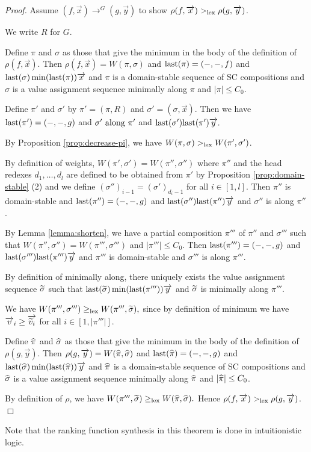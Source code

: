 {\em Proof.}
Assume $(f,\Vec x) \to^G (g,\Vec y)$ to show
$\rho(f,\Vec x) >_\Lex \rho(g,\Vec y)$.

We write $R$ for $G$.

Define $\pi$ and $\sigma$ as those that give the minimum
in the body of the definition of $\rho(f,\Vec x)$.
Then
$
\rho(f,\Vec x)=W(\pi,\sigma)
$
and
$
\Last(\pi) = (-,-,f)
$
and
$
\Last(\sigma) \min(\Last(\pi)) \Vec x
$
and
$\pi$ is a domain-stable sequence of SC compositions and
$\sigma$ is a value assignment sequence minimally along $\pi$ and
$|\pi| \le C_0$.

Define $\pi'$ and $\sigma'$ by
$
\pi'=(\pi,R)
$
and
$
\sigma'=(\sigma,\Vec x).
$
Then we have
$
\Last(\pi') = (-,-,g)
$
and
$
\sigma' \hbox{\ along\ } \pi'
$
and
$\Last(\sigma') \Last(\pi') \Vec y.$

By Proposition \ref{prop:decrease-pi},
we have
$W(\pi,\sigma) >_\Lex W(\pi',\sigma')$.

By definition of weights,
$
W(\pi',\sigma')=W(\pi'',\sigma'')
$
where $\pi''$ and the head redexes $d_1,\ldots,d_l$ are 
defined to be obtained from $\pi'$ by
Proposition \ref{prop:domain-stable} (2) and
we define $(\sigma'')_{i-1} = (\sigma')_{d_i-1}$ for all $i \in [1,l]$.
Then
$\pi''$ is domain-stable
and $\Last(\pi'')=(-,-,g)$
and $\Last(\sigma'') \Last(\pi'') \Vec y$
and $\sigma''$ is along $\pi''$.

By Lemma \ref{lemma:shorten},
we have a partial composition $\pi'''$ of $\pi''$ and $\sigma'''$
such that
$
W(\pi'',\sigma'')=W(\pi''',\sigma''')
$
and $|\pi'''| \le C_0$.
Then $\Last(\pi''')=(-,-,g)$
and $\Last(\sigma''') \Last(\pi''') \Vec y$
and $\pi'''$ is domain-stable
and $\sigma'''$ is along $\pi'''$.

By definition of minimally along,
there uniquely exists the value assignment sequence $\Tilde\sigma$ such that
$\Last(\Tilde\sigma) \min(\Last(\pi''')) \Vec y$
and $\Tilde\sigma$ is minimally along $\pi'''$.

We have
$
W(\pi''',\sigma''')\ge_\Lex W(\pi''',\Tilde\sigma),
$
since by definition of minimum we have
$\Vec v_i \ge \Vec{\Tilde v_i}$ for all $i \in [1,|\pi'''|]$.

Define $\Hat\pi$ and $\Hat\sigma$ 
as those that give the minimum
in the body of the definition of $\rho(g,\Vec y)$.
Then 
$
\rho(g,\Vec y)=W(\Hat\pi,\Hat\sigma)
$
and
$
\Last(\Hat\pi) = (-,-,g)
$
and
$
\Last(\Hat\sigma) \min(\Last(\Hat\pi)) \Vec y$
and
$\Hat\pi$ is a domain-stable sequence of SC compositions and
$\Hat\sigma$ is a value assignment sequence minimally along $\Hat\pi$
and $|\Hat\pi| \le C_0$.

By definition of $\rho$, we have
$
W(\pi''',\Tilde\sigma) \ge_\Lex W(\Hat\pi,\Hat\sigma).
$
Hence
$\rho(f,\Vec x) >_\Lex \rho(g,\Vec y)$.
$\Box$

Note that the ranking function synthesis in this theorem
is done in intuitionistic logic.

